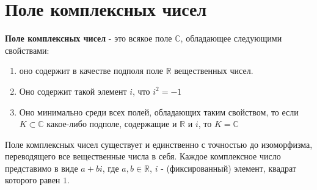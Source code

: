 \section{Поле комплексных чисел}
\textbf{Поле комплексных чисел} - это всякое поле $\mathbb{C}$, обладающее следующими свойствами:
\begin{enumerate}
	\item оно содержит в качестве подполя поле $\mathbb{R}$ вещественных чисел.
	\item Оно содержит такой элемент $i$, что $i^2 = -1$
	\item Оно минимально среди всех полей, обладающих таким свойством, то если $K \subset \mathbb{C}$ какое-либо подполе, содержащие и $\mathbb{R}$ и $i$, то $K = \mathbb{C}$
\end{enumerate}

\begin{theorem}
	Поле комплексных чисел существует и единственно с точностью до изоморфизма, переводящего все вещественные числа в себя. Каждое комплексное число представимо в виде $a + bi$, где $a, b \in \mathbb{R}$, $i$ - (фиксированный) элемент, квадрат которого равен $1$.
\end{theorem}


